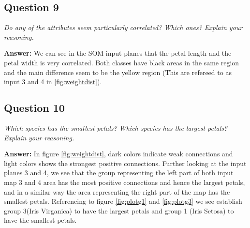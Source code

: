 \documentclass[a4paper]{article}
\begin{document}



\subsection*{Question 9}
\emph{Do any of the attributes seem particularly correlated? Which
ones? Explain your reasoning.}

\textbf{Answer:}  We can see in the SOM input planes that the petal length and the petal width is very correlated. Both classes have black areas in the same region and the main difference seem to be the yellow region (This are refereed to as input 3 and 4 in \ref{fig:weightdist}). 

\subsection*{Question 10}
\emph{Which species has the smallest petals? Which species has the
largest petals? Explain your reasoning.}

\textbf{Answer:} 
In figure \ref{fig:weightdist}, dark colors indicate weak connections and light colors shows the strongest positive connections. Further looking at the input planes 3 and 4, we see that the group representing the left part of both input map 3 and 4 area has the most positive connections and hence the largest petals, and in a similar way the area representing the right part of the map has the smallest petals. Referencing to figure \ref{fig:plotg1} and \ref{fig:plotg3} we see establish group 3(Iris Virganica) to have the largest petals and group 1 (Iris Setosa) to have the smallest petals.
\end{document}
